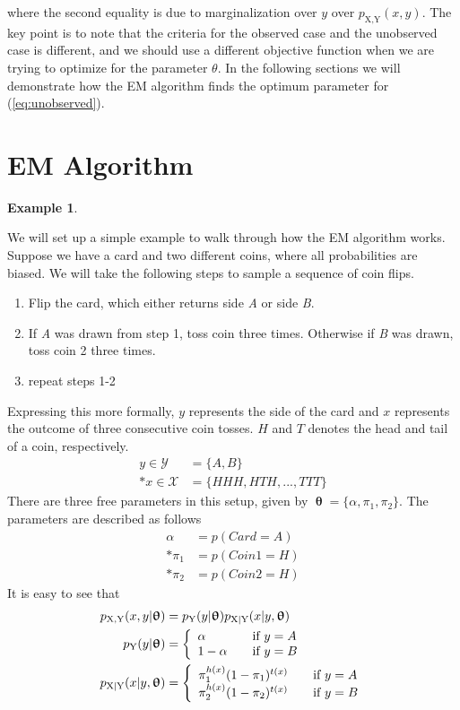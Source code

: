 \documentclass[justified, marginals=justified]{tufte-handout}
\theoremstyle{definition}
\newtheorem{exmp}{Example}
\begin{document}
\noindent where the second equality is due to marginalization over $y$ over $p_{ \text{X,Y} }(x,y)$. The key point is to note that the criteria for the observed case and the unobserved case is different, and we should use a different objective function when we are trying to optimize for the parameter $\theta$. In the following sections we will demonstrate how the EM algorithm finds the optimum parameter for (\ref{eq:unobserved}).

\section{EM Algorithm}\label{sec:em-algorithm}
\begin{exmp}\label{exmp1}

We will set up a simple example to walk through how the EM algorithm works. Suppose we have a card and two different coins, where all probabilities are biased. We will take the following steps to sample a sequence of coin flips.
\begin{enumerate}
	\item Flip the card, which either returns side \textit{A} or side \textit{B}.
	\item If \textit{A} was drawn from step 1, toss coin  three times. Otherwise if \textit{B} was drawn, toss coin 2 three times. 
	\item repeat steps 1-2
\end{enumerate}

Expressing this more formally, $y$ represents the side of the card and $x$ represents the outcome of three consecutive coin tosses. $H$ and $T$ denotes the head and tail of a coin, respectively. 
\begin{align*}
y \in \mathcal{Y} &= \{A, B\} \\*
x \in \mathcal{X} &= \{HHH, HTH, ..., TTT\}
\end{align*}
There are three free parameters in this setup, given by $\bm\uptheta = \{\alpha, \pi_1, \pi_2 \}$. The parameters are described as follows
\begin{align*}
\alpha &= p(Card = A) \\*
\pi_1 &= p(Coin 1 = H) \\*
\pi_2 &= p(Coin 2 = H) 
\end{align*}
It is easy to see that
\begin{align*}
p_{\text{X,Y}}(x,y|\bm\uptheta) &= p_{\text{Y}}(y|\bm\uptheta)p_{\text{X|Y}}(x|y,\bm\uptheta) \\*
p_{\text{Y}}(y|\bm\uptheta) &= \left\{ 
	\begin{array}{l l}
		\alpha & \quad \text{if $y = A$}\\
		1-\alpha & \quad \text{if $y = B	$}
	\end{array} \right.\\*
p_{\text{X|Y}}(x|y,\bm\uptheta) &= \left\{ 
	\begin{array}{l l}
		\pi_1^{h(x)}(1-\pi_1)^{t(x)} & \quad \text{if $y = A$}\\
		\pi_2^{h(x)}(1-\pi_2)^{t(x)} & \quad \text{if $y = B	$}
	\end{array} \right.
\end{align*}


\end{exmp}
\end{document}
